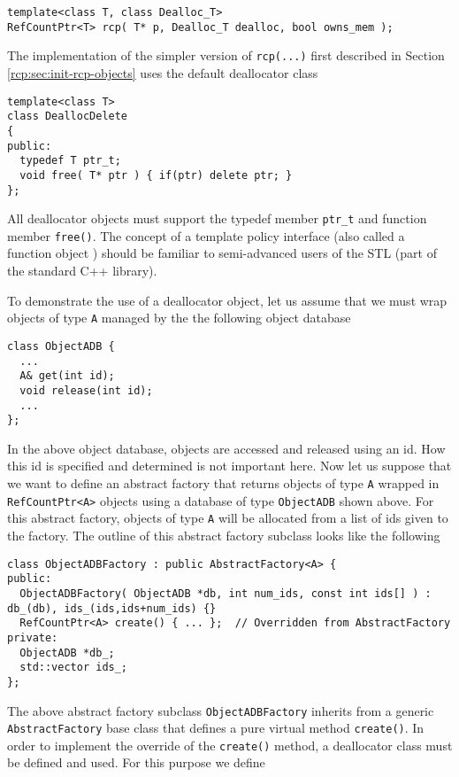{\scriptsize\begin{verbatim}
template<class T, class Dealloc_T>
RefCountPtr<T> rcp( T* p, Dealloc_T dealloc, bool owns_mem );
\end{verbatim}}

The implementation of the simpler version of {}\texttt{rcp(...)} first
described in Section {}\ref{rcp:sec:init-rcp-objects} uses the default
deallocator class

{\scriptsize\begin{verbatim}
template<class T>
class DeallocDelete
{
public:
  typedef T ptr_t;
  void free( T* ptr ) { if(ptr) delete ptr; }
};
\end{verbatim}}

All deallocator objects must support the typedef member
{}\texttt{ptr\_t} and function member {}\texttt{free()}.  The concept
of a template policy interface (also called a function object
\cite[Section 18.4]{ref:stroustrup_2000}) should be familiar to
semi-advanced users of the STL (part of the standard C++ library).

To demonstrate the use of a deallocator object, let us assume that we
must wrap objects of type {}\texttt{A} managed by the the following
object database

{\scriptsize\begin{verbatim}
class ObjectADB {
  ...
  A& get(int id);
  void release(int id);
  ...
};
\end{verbatim}}

In the above object database, objects are accessed and released using
an id.  How this id is specified and determined is not important here.
Now let us suppose that we want to define an abstract factory that
returns objects of type {}\texttt{A} wrapped in
{}\texttt{RefCountPtr<A>} objects using a database of type
{}\texttt{ObjectADB} shown above.  For this abstract factory, objects
of type {}\texttt{A} will be allocated from a list of ids given to the
factory.  The outline of this abstract factory subclass looks like the
following

{\scriptsize\begin{verbatim}
class ObjectADBFactory : public AbstractFactory<A> {
public:
  ObjectADBFactory( ObjectADB *db, int num_ids, const int ids[] ) : db_(db), ids_(ids,ids+num_ids) {}
  RefCountPtr<A> create() { ... };  // Overridden from AbstractFactory
private:
  ObjectADB *db_;
  std::vector ids_;
};
\end{verbatim}}

The above abstract factory subclass {}\texttt{ObjectADBFactory}
inherits from a generic {}\texttt{AbstractFactory} base class that
defines a pure virtual method {}\texttt{create()}.  In order to
implement the override of the {}\texttt{create()} method, a
deallocator class must be defined and used.  For this purpose we
define


